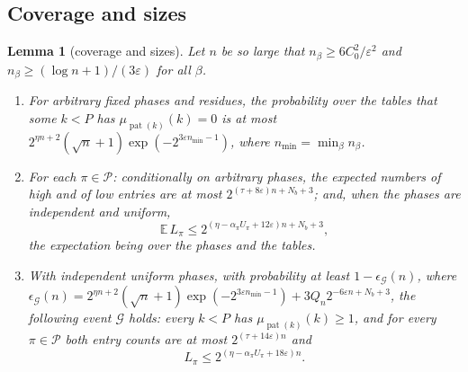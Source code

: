 \documentclass[11pt]{article}
\newtheorem{lemma}{Lemma}[section]
\theoremstyle{definition}
\newcommand{\E}{\mathbb E}
\newcommand{\eps}{\varepsilon}
\newcommand{\cG}{\mathcal G}
\newcommand{\cP}{\mathcal P}
\newcommand{\pat}{\operatorname{pat}}
\begin{document}
\subsection{Coverage and sizes}
\begin{lemma}[coverage and sizes]\label{lem:cov}
Let $n$ be so large that $n_\beta\ge6C_0^2/\eps^2$ and $n_\beta\ge(\log n+1)/(3\eps)$ for all $\beta$.
\begin{enumerate}[label=\textup{(\roman*)}]
\item For arbitrary fixed phases and residues, the probability over the tables that some $k<P$ has
$\mu_{\pat(k)}(k)=0$ is at most $2^{\eta n+2}(\sqrt n+1)\exp(-2^{3\eps n_{\min}-1})$, where
$n_{\min}=\min_\beta n_\beta$.
\item For each $\pi\in\cP$: conditionally on arbitrary phases, the expected numbers of high and of low entries are
at most $2^{(\tau+8\eps)n+N_b+3}$; and, when the phases are independent and uniform,
\begin{equation}\label{eq:EL}
 \E\,L_\pi\le2^{(\eta-\alpha_\pi U_\pi+12\eps)n+N_b+3},
\end{equation}
the expectation being over the phases and the tables.
\item With independent uniform phases, with probability at least $1-\epsilon_{\cG}(n)$, where
$\epsilon_{\cG}(n)=2^{\eta n+2}(\sqrt n+1)\exp(-2^{3\eps n_{\min}-1})+3Q_n2^{-6\eps n+N_b+3}$, the following event $\cG$
holds: every $k<P$ has $\mu_{\pat(k)}(k)\ge1$, and for every $\pi\in\cP$ both entry counts are at most
$2^{(\tau+14\eps)n}$ and
\begin{equation}\label{eq:Lgood}
 L_\pi\le2^{(\eta-\alpha_\pi U_\pi+18\eps)n}.
\end{equation}
\end{enumerate}
\end{lemma}
\end{document}
